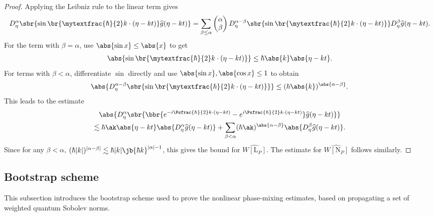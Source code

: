\begin{proof}
Applying the Leibniz rule to the linear term gives\vspace*{-3pt}
\[
D_\eta^\alpha\sbr{\sin\br{\mytextfrac{\hbar}{2}k\cdot(\eta-kt)}\widehat g(\eta-kt)}
=\sum_{\beta\leq \alpha}\begin{pmatrix}
\alpha\\
\beta
\end{pmatrix}D_\eta^{\alpha-\beta}\sbr{\sin\br{\mytextfrac{\hbar}{2}k\cdot(\eta-kt)}}D^\beta_\eta\widehat g(\eta-kt).
\]
For the term with \( \beta = \alpha \), use \( \abs{\sin x} \leq \abs{x} \) to get\vspace*{-3pt}
\begin{align*}
\abs{\sin\br{\mytextfrac{\hbar}{2}k\cdot(\eta-kt)}}\leq \hbar\abs{k}\abs{\eta-kt}.
\end{align*}
For terms with \( \beta < \alpha \), differentiate $\sin$ directly and use \( \abs{\sin x},\abs{\cos x} \leq 1 \) to obtain\vspace*{-3pt}
\begin{align*}
\abs{D^{\alpha-\beta}_{\eta}\sbr{\sin\br{\mytextfrac{\hbar}{2}k\cdot(\eta-kt)}}}\leq (\hbar \abs{k})^{\abs{\alpha-\beta}}.
\end{align*}
This leads to the estimate
\begin{multline*}
\abs{D_\eta^\alpha\sbr{\bbr{e^{-i\Psfrac{\hbar}{2}k\cdot(\eta-kt)}-e^{i\Psfrac{\hbar}{2}k\cdot(\eta-kt)}}\widehat g(\eta-kt)}}\\
\lesssim \hbar\ak\abs{\eta-kt}\abs{D_\eta^\alpha\widehat g(\eta-kt)}+\sum_{\beta<\alpha}(\hbar\ak)^{\abs{\alpha-\beta}}\abs{D_\eta^\beta\widehat g(\eta-kt)}.
\end{multline*}
Since for any \( \beta < \alpha \), $(\hbar |k|)^{|\alpha - \beta|} \lesssim \hbar |k| \jb{\hbar k}^{|\alpha| - 1}$, this gives the bound for $\widehat{W[{\mathrm{L}_P}]}$. The estimate for \( \widehat{W[{\mathrm{N}_P}]} \) follows similarly.\end{proof}

\subsection{Bootstrap scheme} This subsection introduces the bootstrap scheme used to prove the nonlinear phase-mixing estimates, based on propagating a set of weighted quantum Sobolev norms.
